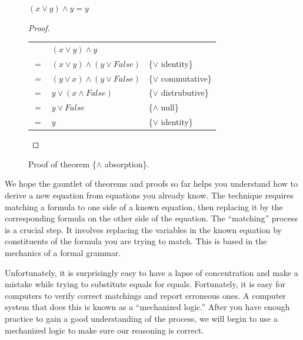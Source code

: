 \begin{figure}
\begin{theorem}
$(x \vee y) \wedge y = y$
\end{theorem}

\begin{proof}
\mbox{} \\
\begin{tabular}{llp{3.15in}}
    & $(x \vee y) \wedge y$                & \\
$=$ & $(x \vee y) \wedge (y \vee False)$   & \{$\vee$ identity\} \\
$=$ & $(y \vee x) \wedge (y \vee False)$   & \{$\vee$ commutative\} \\
$=$ & $y \vee (x \wedge False)$            & \{$\vee$ distrubutive\} \\
$=$ & $y \vee False$                       & \{$\wedge$ null\} \\
$=$ & $y$                                  & \{$\vee$ identity\} \\
\end{tabular}

\end{proof}
\caption{Proof of theorem \{$\wedge$ absorption\}.}
\label{and-absorption-thm}
\end{figure}

We hope the gauntlet of theorems and proofs so far
helps you understand how to derive a new equation from equations you already know.
The technique requires matching a formula to one side of a known equation,
then replacing it by the corresponding formula on the other side
of the equation.
The
``matching'' process is a crucial step.
It involves replacing the variables in the known equation
by constituents of the formula you are trying to match.
This is based in the mechanics of a formal grammar.

Unfortunately, it is surprisingly easy
to have a lapse of concentration and make a mistake
while trying to substitute equals for equals.
Fortunately, it is easy for computers to verify
correct matchings and report erroneous ones.
A computer system that does this is known as a ``mechanized logic.''
After you have enough practice to gain a good understanding of the process,
we will begin to use a mechanized logic to make sure our reasoning is correct.

